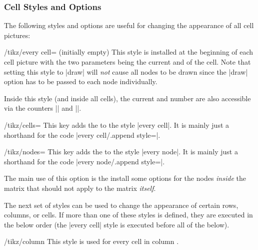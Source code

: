 \subsubsection{Cell Styles and Options}

The following styles and options are useful for changing the appearance of all
cell pictures:

\begin{stylekey}{/tikz/every cell= (initially \normalfont empty)}
    This style is installed at the beginning of each cell picture with the two
    parameters being the current  and  of the cell. Note
    that setting this style to |draw| will \emph{not} cause all nodes to be
    drawn since the |draw| option has to be passed to each node individually.

    Inside this style (and inside all cells), the current  and
     number are also accessible via the counters
    |\pgfmatrixcurrentrow| and |\pgfmatrixcurrentcolumn|.
\end{stylekey}

\begin{key}{/tikz/cells=}
    This key adds the  to the style |every cell|. It is mainly
    just a shorthand for the code |every cell/.append style=|.
\end{key}

\begin{key}{/tikz/nodes=}
    This key adds the  to the style |every node|. It is mainly
    just a shorthand for the code |every node/.append style=|.

    The main use of this option is the install some options for the nodes
    \emph{inside} the matrix that should not apply to the matrix \emph{itself}.
\begin{codeexample}[]
\end{codeexample}
\end{key}

The next set of styles can be used to change the appearance of certain rows,
columns, or cells. If more than one of these styles is defined, they are
executed in the below order (the |every cell| style is executed before all of
the below).
%
\begin{stylekey}{/tikz/column }
    This style is used for every cell in column .
\end{stylekey}

